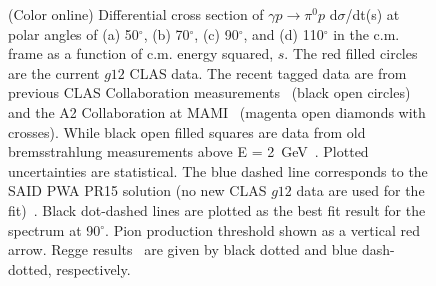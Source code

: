 \documentclass[aps,prc,twocolumn,floatfix,showpacs,preprintnumbers,amsmath,amssymb,superscriptaddress,linenumbers]{revtex4-1}
\begin{document}
\begin{figure}[htb!]
        \caption {(Color online) Differential cross section of 
	$\gamma p\rightarrow\pi^0p$ d$\sigma$/dt(s) at polar angles 
	of (a) 50$^\circ$, (b) 70$^\circ$, 
	(c) 90$^\circ$, and (d) 
	110$^\circ$ in the c.m. frame as a function of c.m. energy 
	squared, $s$. The red filled circles are the current $g12$ 
	CLAS data. The recent tagged data are from previous 
	CLAS Collaboration 
	measurements~\protect\cite{Dugger:2007bt} (black open 
	circles) and the A2 Collaboration at 
	MAMI~\protect\cite{Adlarson:2015byy} 
	(magenta open diamonds with crosses). While black open filled 
	squares are data from old bremsstrahlung measurements above 
	E = 2~GeV~\protect\cite{brem}. Plotted uncertainties are 
	statistical.  
	The blue dashed line corresponds to the SAID PWA 
	PR15 solution (no new CLAS $g12$ data are used 
	for the fit)~\protect\cite{Adlarson:2015byy}.  Black dot-dashed 
	lines are plotted as the best fit result for the spectrum at 
	90$^\circ$. Pion production threshold shown as a vertical 
	red arrow. Regge results~\protect\cite{Goldstein:1973xn,
	Laget:2005be} are given by black dotted and blue dash-dotted, 
	respectively.} \label{fig:scaling}
\end{figure}
\end{document}
